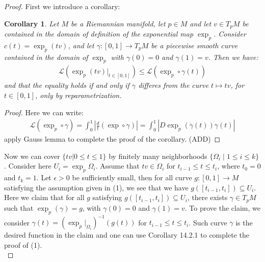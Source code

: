 \documentclass[11pt]{book}
\theoremstyle{break}
\theoremstyle{break}
\newtheorem{corT}[lem]{Corollary}
\begin{document}
\begin{proof}
First we introduce a corollary:
\begin{corT}
Let $M$ be a Riemannian manifold, let $p \in M$ and let $v \in T_pM$ be contained in the domain of definition of the exponential map $\exp_p$. Consider $c(t)  = \exp_p(tv)$, and let $\gamma:[0,1]\to T_pM$ be a piecewise smooth curve contained in the domain of $\exp_p$ with $\gamma(0) = 0$ and $\gamma(1) = v$. Then we have:
\begin{align*}
\mathcal{L}\left( \exp_p (tv)|_{t \in [0,1]}\right)  \leq \mathcal{L}\left( \exp_p \circ \gamma (t) \right)
\end{align*}
and that the equality holds if and only if $\gamma$ differes from the curve $t\mapsto tv$, for $t \in [0,1]$, only by reparametrization. 
\end{corT}
\begin{proof}
Here we can write:
\begin{align*}
\mathcal{L}( \exp_p\circ \gamma) = \int_0^1 \left| \frac{d}{t} (\exp \circ \gamma) \right| = \int_0^1 |D\exp_p(\dot{\gamma}(t) ) \gamma(t) | 
\end{align*}
apply Gauss lemma to complete the proof of the corollary.
(ADD)
\end{proof}
Now we can cover $\{tv | 0\leq t \leq 1\}$ by finitely many neighborhoods $\{\Omega_i \mid 1\leq i \leq k\}$. Consider here $U_i = \exp_p \Omega_i$. Assume that $tv \in \Omega_i$ for $t_{i-1} \leq t \leq t_i$, where $t_0 = 0$ and $t_k = 1$. Let $\epsilon>0$ be sufficiently small, then for all curve $g:[0,1] \to M $ satisfying the assumption given in (1), we see that we have $g([t_{i-1}, t_i]) \subseteq U_i$. Here we claim that for all $g$ satisfying $g([t_{i-1}, t_i]) \subseteq U_i$, there exists $\gamma \in T_pM$ such that $\exp_p(\gamma) = g$, with $\gamma(0) = 0$ and $\gamma(1) = v$. To prove the claim, we consider $\gamma(t) = \left(\exp_p|_{\Omega_i}\right)^{-1} (g(t))$ for $t_{i-1} \leq t \leq t_i$. Such curve $\gamma $ is the desired function in the claim and one can use Corollary 14.2.1 to complete the proof of (1).\\



\end{proof}
\end{document}
